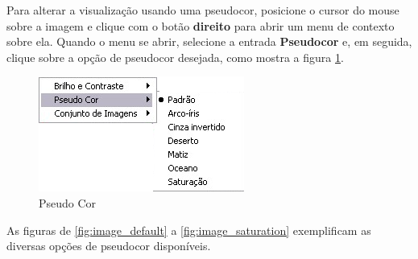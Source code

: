 Para alterar a visualização usando uma pseudocor, posicione o cursor do mouse sobre a imagem e clique
com o botão \textbf{direito} para abrir um menu de contexto sobre ela. Quando o menu se abrir,
selecione a entrada \textbf{Pseudocor} e, em seguida, clique sobre a opção de pseudocor desejada, como
mostra a figura \ref{fig:pseudo_color}.

\begin{figure}[H]
\centering
\includegraphics[scale=0.40]{../user_guide_figures/invesalius_screen/pseudo_menu_pt.png}
\caption{Pseudo Cor}
\label{fig:pseudo_color}
\end{figure}

As figuras de \ref{fig:image_default} a \ref{fig:image_saturation} exemplificam as diversas opções de
pseudocor disponíveis.

